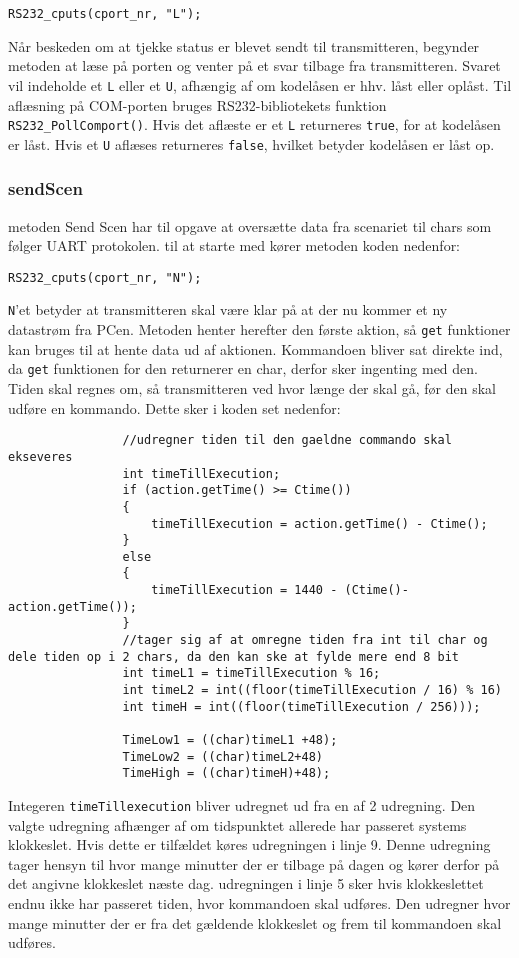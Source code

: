 \begin{lstlisting}
RS232_cputs(cport_nr, "L");
\end{lstlisting} 

Når beskeden om at tjekke status er blevet sendt til transmitteren, begynder metoden at læse på porten og venter på et svar tilbage fra transmitteren. Svaret vil indeholde et \texttt{L} eller et \texttt{U}, afhængig af om kodelåsen er hhv. låst eller oplåst. Til aflæsning på COM-porten bruges RS232-bibliotekets funktion \texttt{RS232\_PollComport()}.
Hvis det aflæste er et \texttt{L} returneres \texttt{true}, for at kodelåsen er låst. Hvis et \texttt{U} aflæses returneres \texttt{false}, hvilket betyder kodelåsen er låst op.

\subsubsection{sendScen}
metoden Send Scen har til opgave at oversætte data fra scenariet til chars som følger UART protokolen.
til at starte med kører metoden koden nedenfor:
\begin{lstlisting}
RS232_cputs(cport_nr, "N");
\end{lstlisting} 
\texttt{N}'et betyder at transmitteren skal være klar på at der nu kommer et ny datastrøm fra PCen. 
Metoden henter herefter den første aktion, så \texttt{get} funktioner kan bruges til at hente data ud af aktionen.
Kommandoen bliver sat direkte ind, da \texttt{get} funktionen for den returnerer en char, derfor sker ingenting med den. 
Tiden skal regnes om, så transmitteren ved hvor længe der skal gå, før den skal udføre en kommando. Dette sker i koden set nedenfor:
\begin{lstlisting}
				//udregner tiden til den gaeldne commando skal ekseveres
				int timeTillExecution;
				if (action.getTime() >= Ctime())
				{
					timeTillExecution = action.getTime() - Ctime();
				}
				else
				{ 
					timeTillExecution = 1440 - (Ctime()-action.getTime()); 
				}
				//tager sig af at omregne tiden fra int til char og dele tiden op i 2 chars, da den kan ske at fylde mere end 8 bit
				int timeL1 = timeTillExecution % 16; 
				int timeL2 = int((floor(timeTillExecution / 16) % 16)
				int timeH = int((floor(timeTillExecution / 256)));

				TimeLow1 = ((char)timeL1 +48);
				TimeLow2 = ((char)timeL2+48)
				TimeHigh = ((char)timeH)+48);
\end{lstlisting} 
Integeren \texttt{timeTillexecution} bliver udregnet ud fra en af 2 udregning. Den valgte udregning afhænger af om tidspunktet allerede har passeret systems klokkeslet. Hvis dette er tilfældet køres udregningen i linje 9. Denne udregning tager hensyn til hvor mange minutter der er tilbage på dagen og kører derfor på det angivne klokkeslet næste dag. udregningen i linje 5 sker hvis klokkeslettet endnu ikke har passeret tiden, hvor kommandoen skal udføres. Den udregner hvor mange minutter der er fra det gældende klokkeslet og frem til kommandoen skal udføres.
